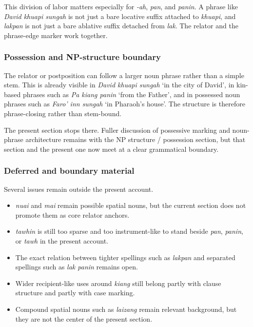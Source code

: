 \documentclass[
  11pt,
  a4paper,
]{article}
\providecommand{\tightlist}{%
  \setlength{\itemsep}{0pt}\setlength{\parskip}{0pt}}
\newcommand{\tdim}[1]{\textit{#1}}
\newcommand{\glossquote}[1]{`#1'}
\begin{document}
This division of labor matters especially for \tdim{-ah}, \tdim{pan},
and \tdim{panin}. A phrase like \tdim{David khuapi sungah} is not just a
bare locative suffix attached to \tdim{khuapi}, and \tdim{lakpan} is not
just a bare ablative suffix detached from \tdim{lak}. The relator and
the phrase-edge marker work together.

\subsubsection{Possession and NP-structure
boundary}\label{possession-and-np-structure-boundary}

The relator or postposition can follow a larger noun phrase rather than
a simple stem. This is already visible in \tdim{David khuapi sungah}
\glossquote{in the city of David}, in kin-based phrases such as
\tdim{Pa kiang panin} \glossquote{from the Father}, and in possessed
noun phrases such as \tdim{Faro' inn sungah}
\glossquote{in Pharaoh's house}. The structure is therefore
phrase-closing rather than stem-bound.

The present section stops there. Fuller discussion of possessive marking
and noun-phrase architecture remains with the NP structure / possession
section, but that section and the present one now meet at a clear
grammatical boundary.

\subsubsection{Deferred and boundary
material}\label{deferred-and-boundary-material-1}

Several issues remain outside the present account.

\begin{itemize}
\tightlist
\item
  \tdim{nuai} and \tdim{mai} remain possible spatial nouns, but the
  current section does not promote them as core relator anchors.
\item
  \tdim{tawhin} is still too sparse and too instrument-like to stand
  beside \tdim{pan}, \tdim{panin}, or \tdim{tawh} in the present
  account.
\item
  The exact relation between tighter spellings such as \tdim{lakpan} and
  separated spellings such as \tdim{lak panin} remains open.
\item
  Wider recipient-like uses around \tdim{kiang} still belong partly with
  clause structure and partly with case marking.
\item
  Compound spatial nouns such as \tdim{laizang} remain relevant
  background, but they are not the center of the present section.
\end{itemize}
\end{document}
